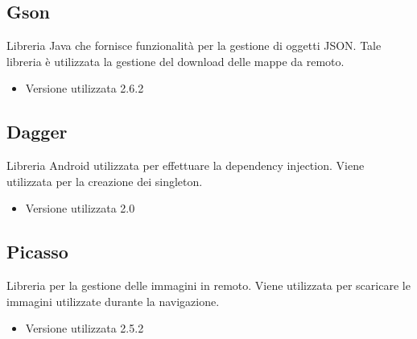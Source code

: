 \documentclass[../DocumentazioneDelloStudio.tex]{subfiles}
\begin{document}
	\subsection{Gson}
		Libreria Java che fornisce funzionalità per la gestione di oggetti JSON. Tale libreria è utilizzata la gestione del download delle mappe da remoto. 
		\begin{itemize} \item Versione utilizzata 2.6.2\end{itemize}

	\subsection{Dagger}
		Libreria Android utilizzata per effettuare la dependency injection. Viene utilizzata per la creazione dei singleton.
		\begin{itemize} \item Versione utilizzata 2.0\end{itemize}

	\subsection{Picasso}
		Libreria per la gestione delle immagini in remoto. Viene utilizzata per scaricare le immagini utilizzate durante la navigazione.
		\begin{itemize} \item Versione utilizzata 2.5.2\end{itemize}
\end{document}
